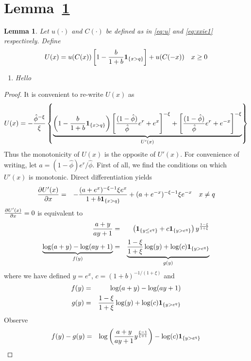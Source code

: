 \documentclass[11pt,a4]{amsart}
\newcommand{\pd}{\partial}
\newtheorem{lemma}{Lemma}[section]
\newcommand{\1}{{\mathbf 1}}
\begin{document}
\section{Lemma~\ref{lemma:III}}
\begin{lemma}\label{lemma:III}
Let $u(\cdot)$  and $C(\cdot)$ be defined as in \eqref{eq:u} and \eqref{eq:xxie1} respectively. Define
\[
U(x) =
u(C(x)) \left[
  1 - {b \over 1 + b}\1_{\{x > q\}}
  \right]
+ u(C(-x))
\quad
x \geq 0
\]
\begin{enumerate}
\item  Hello
\end{enumerate}
\end{lemma}
\begin{proof}
  It is convenient to re-write $U(x)$ as
  \[
  U(x) = 
  -{\hat\phi^{-\xi} \over \xi} \left\{
    \underbrace{
    \left(1 - {b \over 1 + b}\1_{\{x > q\}}\right)
    \left[{(1 - \hat\phi) \over \hat\phi} e^r + e^x\right]^{-\xi}
    +
    \left[{(1 - \hat\phi) \over \hat\phi} e^r + e^{-x}\right]^{-\xi}
  }_{U'(x)}
\right\}
\]
  Thus the monotonicity of $U(x)$ is the opposite of $U'(x)$. For
  convenience of writing, let $a = (1 - \hat\phi)e^r/\hat\phi$.
  First of all, we find the conditions on which $U'(x)$ is monotonic.
  Direct differentiation yields
  \begin{eqnarray*}
    {\pd U'(x) \over \pd x}
    &=&
    -{
      (a + e^x)^{-\xi - 1} \xi e^x
      \over
      1 + b \1_{\{x > q\}}
    } + (a + e^{-x})^{-\xi - 1} \xi e^{-x}
    \quad
    x \neq q
  \end{eqnarray*}
  ${\pd U'(x) \over \pd x} = 0$ is equivalent to
  \begin{eqnarray*}
    {a + y \over a y + 1} &=& 
    \left( \1_{\{y \leq e^q\}} + c \1_{\{y > e^q\}} \right)
    y^{1 -\xi \over 1+\xi} \\
    \underbrace{\log(a + y) - \log(a y + 1)}_{f(y)} &=& \underbrace{{1
        -\xi \over 1+\xi} \log(y)
      + \log(c)\1_{\{y > e^q\}} }_{g(y)} 
  \end{eqnarray*}
  where we have defined $y = e^x$, $c = (1 + b)^{-1/(1 + \xi)}$ and
  \begin{eqnarray*}
    f(y) &=& \log(a + y) - \log(a y + 1) \\
    g(y) &=& {1 -\xi \over 1+\xi} \log(y) + \log(c) \1_{\{y > e^q\}}
  \end{eqnarray*}
  Observe
  \begin{eqnarray}
    f(y) - g(y) &=& \log\left(
      {a + y \over a y + 1}
      y^{\xi - 1 \over \xi + 1}
    \right) - \log(c)\1_{\{y > e^q\}} \label{eq:f-g}

\end{eqnarray}
\end{proof}
\end{document}
